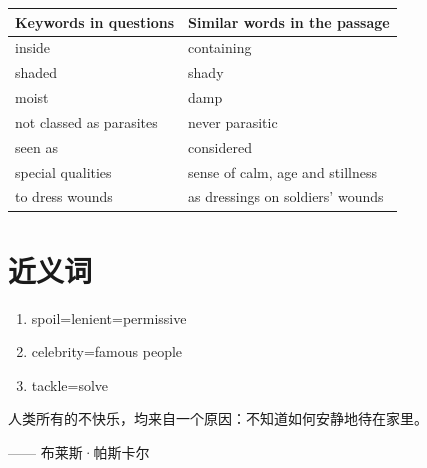 \documentclass[12pt,a4paper]{article}
\newcommand{\upmean}[1]{\raisebox{0.25ex}{\scriptsize #1}}
\begin{document}
\begin{tabular}{|>{\raggedright\arraybackslash}p{5cm}|>{\raggedright\arraybackslash}p{8cm}|}
\hline
\rowcolor{purple!20} %
\textbf{Keywords in questions} & \textbf{Similar words in the passage} \\
\hline
inside & containing \\
\hline
shaded & shady \\
\hline
moist & damp \\
\hline
not classed as parasites & never parasitic \\
\hline
seen as & considered \\
\hline
special qualities & sense of calm, age and stillness \\
\hline
to dress wounds & as dressings on soldiers' wounds \\
\hline
\end{tabular}




























\newpage
\section*{近义词}
\begin{enumerate}
    \item spoil=lenient=permissive
    \item celebrity=famous people
    \item tackle=solve
\end{enumerate}











\newpage


人类所有的不快乐，均来自一个原因：不知道如何安静地待在家里。

{\raggedleft —— 布莱斯·帕斯卡尔\par}
\end{document}
